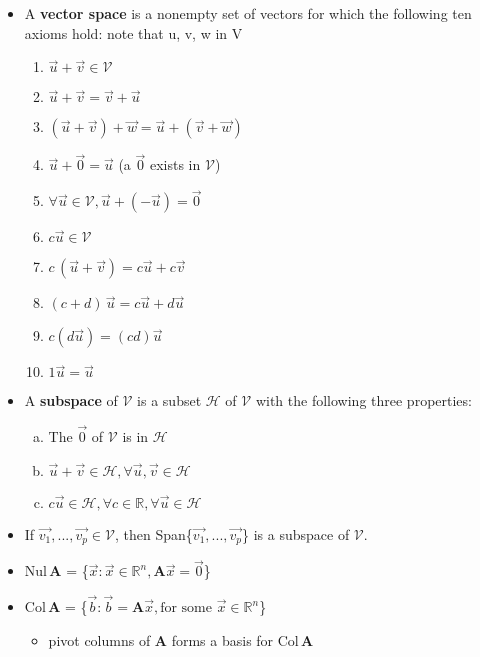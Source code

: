 \documentclass[11pt]{article}
\newcommand{\Thm}{\fbox{Thm}}
\newcommand{\Def}{\fbox{Def}}
\newcommand{\R}{\mathbb{R}}
\newcommand{\A}{\mathbf{A}}
\begin{document}
\begin{itemize}
\item[\Def] A \textbf{vector space} is a nonempty set of vectors for which the following 
ten axioms hold: note that u, v, w in V
\begin{enumerate} [1)]
  \item $\vec{u} + \vec{v} \in \mathcal{V}$
  \item $\vec{u} + \vec{v} = \vec{v} + \vec{u}$
  \item $(\vec{u} + \vec{v}) + \vec{w} = \vec{u} + (\vec{v} + \vec{w})$
  \item $\vec{u} + \vec{0} = \vec{u}$ (a $\vec{0}$ exists in $\mathcal{V}$)
  \item $\forall \vec{u} \in \mathcal{V}, \vec{u} + (-\vec{u}) = \vec{0}$
  \item $c \vec{u} \in \mathcal{V}$
  \item $c \, (\vec{u} + \vec{v}) = c \vec{u} + c \vec{v}$
  \item $(c+d)\, \vec{u} = c \vec{u} + d \vec{u}$
  \item $c (d \vec{u}) = (cd) \vec{u}$
  \item $1\vec{u} = \vec{u}$
\end{enumerate}

\item[\Def] A \textbf{subspace} of $\mathcal{V}$ is a subset $\mathcal{H}$ of $
\mathcal{V}$ with the following three properties:
\begin{enumerate} [a)]
  \item The $\vec{0}$ of $\mathcal{V}$ is in $\mathcal{H}$
  \item $\vec{u} + \vec{v} \in \mathcal{H}, \forall \vec{u}, \vec{v} \in \mathcal{H}$
  \item $c \vec{u} \in \mathcal{H}, \forall c \in \R, \forall \vec{u} \in \mathcal{H}$
\end{enumerate}

\item[\Thm] If $\vec{v_1}, ... , \vec{v_p} \in \mathcal{V}$, then 
Span\{${\vec{v_1}, ... , \vec{v_p}}$\} is a subspace of $\mathcal{V}$.

\item[\Def] Nul\,$\A$ = \{$\vec{x} : \vec{x} \in \R^n, \A \vec{x} = \vec{0}$\}

\item[\Def] Col\,$\A$ = \{$\vec{b} : \vec{b} = \A \vec{x}, \text{for some } \vec{x} \in \R^n$\}
\begin{itemize}
  \item pivot columns of $\A$ forms a basis for Col\,$\A$
\end{itemize}
  

\end{itemize}
\end{document}
